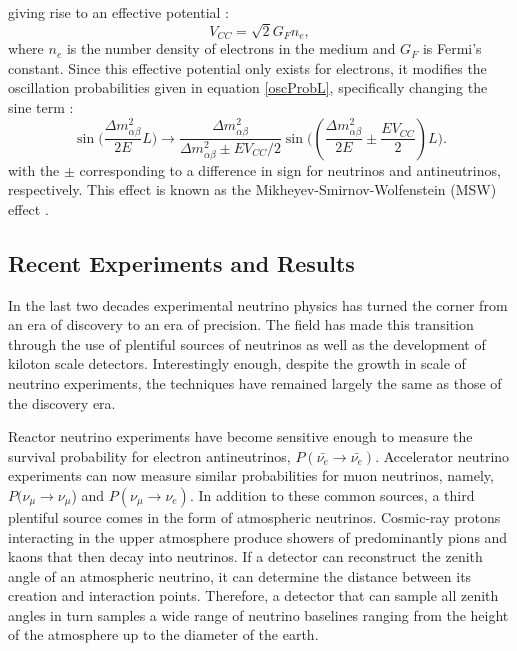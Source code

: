 giving rise to an effective potential \cite{ho2010elementary}:
\begin{equation}
\label{veff}
V_{CC} = \sqrt{2}G_F n_e,
\end{equation}
where $n_e$ is the number density of electrons in the medium and $G_F$ is
Fermi's constant.
Since this effective potential only exists for electrons, it modifies the
oscillation probabilities given in equation \eqref{oscProbL}, specifically
changing the sine term \cite{ho2010elementary}:
\begin{equation}
\label{modSin}
\sin\bigg(\frac{\Delta m_{\alpha\beta}^2}{2E}L\bigg) \rightarrow
\frac{\Delta m_{\alpha\beta}^2}{\Delta m_{\alpha\beta}^2 \pm E V_{CC}/2} \sin\bigg((\frac{\Delta m_{\alpha\beta}^2}{2E} \pm \frac{EV_{CC}}{2})L \bigg).
\end{equation}
with the $\pm$ corresponding to a difference in sign for neutrinos and
antineutrinos, respectively.
This effect is known as the Mikheyev-Smirnov-Wolfenstein (MSW) effect
\cite{wolfenstein1978neutrino}.

\subsection{Recent Experiments and Results}
In the last two decades experimental neutrino physics has turned the corner
from an era of discovery to an era of precision.
The field has made this transition through the use of plentiful sources of
neutrinos as well as the development of kiloton scale detectors.
Interestingly enough, despite the growth in scale of neutrino experiments, the
techniques have remained largely the same as those of the discovery era.

Reactor neutrino experiments \cite{kamland, dayaBay, reno} have become
sensitive enough to measure the survival probability for electron
antineutrinos, $P(\bar{\nu_e} \rightarrow \bar{\nu_e})$.
Accelerator neutrino experiments \cite{minos13,abe2014observation,nova2016nue}
can now
measure similar probabilities for muon neutrinos, namely,
$P(\nu_\mu \rightarrow \nu_\mu$) and $P(\nu_\mu \rightarrow \nu_e)$.
In addition to these common sources, a third plentiful source comes in the form
of atmospheric neutrinos.
Cosmic-ray protons interacting in the upper atmosphere produce showers of
predominantly pions and kaons that then decay into neutrinos.
If a detector can reconstruct the zenith angle of an atmospheric neutrino, it
can determine the distance between its creation and interaction points.
Therefore, a detector that can sample all zenith angles in turn samples a wide
range of neutrino baselines ranging from the height of the atmosphere up to the
diameter of the earth.


